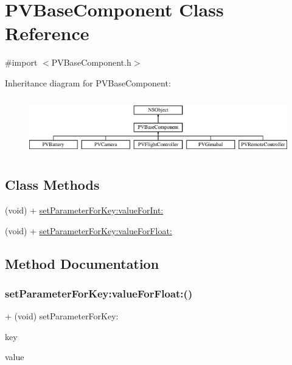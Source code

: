 \hypertarget{interface_p_v_base_component}{}\section{P\+V\+Base\+Component Class Reference}
\label{interface_p_v_base_component}


{\ttfamily \#import $<$P\+V\+Base\+Component.\+h$>$}

Inheritance diagram for P\+V\+Base\+Component\+:\begin{figure}[H]
\begin{center}
\leavevmode
\includegraphics[height=2.507463cm]{interface_p_v_base_component}
\end{center}
\end{figure}
\subsection*{Class Methods}
\begin{DoxyCompactItemize}
\item 
(void) + \hyperlink{interface_p_v_base_component_a8823275eace0c9358aaf7c0ba7d8cffe}{set\+Parameter\+For\+Key\+:value\+For\+Int\+:}
\item 
(void) + \hyperlink{interface_p_v_base_component_a0be538c6f769172259ddbd2c3106469e}{set\+Parameter\+For\+Key\+:value\+For\+Float\+:}
\end{DoxyCompactItemize}


\subsection{Method Documentation}
\mbox{\label{interface_p_v_base_component_a0be538c6f769172259ddbd2c3106469e}} 
\subsubsection{\texorpdfstring{set\+Parameter\+For\+Key\+:value\+For\+Float\+:()}{setParameterForKey:valueForFloat:()}}
{\footnotesize\ttfamily + (void) set\+Parameter\+For\+Key\+: \begin{DoxyParamCaption}\item[{(N\+S\+String $\ast$\+\_\+\+Nonnull)}]{key }\item[{valueForFloat:(float)}]{value }\end{DoxyParamCaption}}

